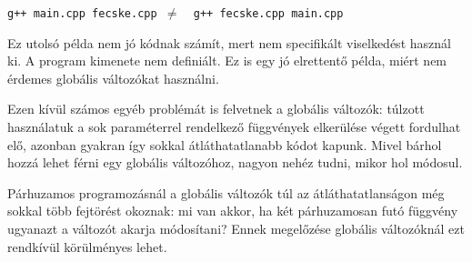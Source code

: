 \documentclass[a4paper,11.5pt]{article}
\begin{document}
	{\centering \texttt{g++ main.cpp fecske.cpp \quad $\not=$\quad\, g++ fecske.cpp main.cpp} \par}
	
	\begin{note}
		Ez utolsó példa nem jó kódnak számít, mert nem specifikált viselkedést használ ki. A program kimenete nem definiált. Ez is egy jó elrettentő példa, miért nem érdemes globális változókat használni.
	\end{note}
	
	Ezen kívül számos egyéb problémát is felvetnek a globális változók: túlzott használatuk a sok paraméterrel rendelkező függvények elkerülése végett fordulhat elő, azonban gyakran így sokkal átláthatatlanabb kódot kapunk. Mivel bárhol hozzá lehet férni egy globális változóhoz, nagyon nehéz tudni, mikor hol módosul.
	\begin{note}
		Párhuzamos programozásnál a globális változók túl az átláthatatlanságon még sokkal több fejtörést okoznak: mi van akkor, ha két párhuzamosan futó függvény ugyanazt a változót akarja módosítani? Ennek megelőzése globális változóknál ezt rendkívül körülményes lehet.
	\end{note}
\end{document}
